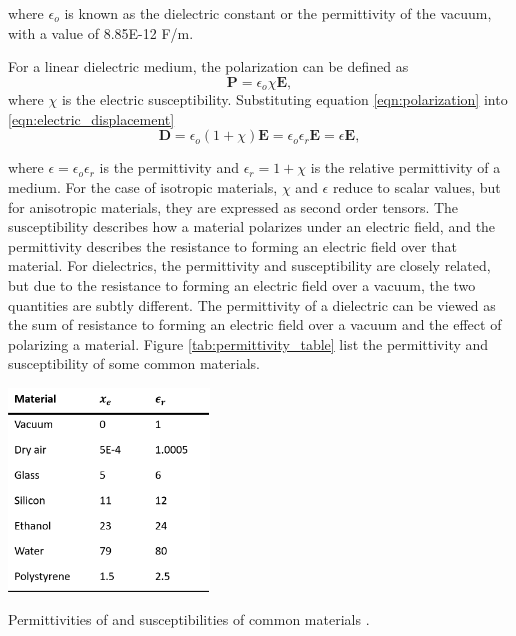  \noindent where $\epsilon_o$ is known as the dielectric constant or the permittivity of the vacuum, with a value of 8.85E-12 F/m.
 
 \par For a linear dielectric medium, the polarization can be defined as 
 \begin{equation}
     \boldsymbol{P} = \epsilon_o\chi\boldsymbol{E},
     \label{eqn:polarization}
 \end{equation}
 \noindent where $\chi$ is the electric susceptibility. Substituting equation \ref{eqn:polarization} into \ref{eqn:electric_displacement}
 \begin{equation}
    \boldsymbol{D} = \epsilon_o(1+\chi)\boldsymbol{E} = \epsilon_o \epsilon_r \boldsymbol{E}=\epsilon\boldsymbol{E},
 \end{equation}
 
 \noindent where $\epsilon = \epsilon_o\epsilon_r$ is the permittivity and $\epsilon_r = 1 + \chi$ is the relative permittivity of a medium. For the case of isotropic materials, $\chi$ and $\epsilon$ reduce to scalar values, but for anisotropic materials, they are expressed as second order tensors. The susceptibility describes how a material polarizes under an electric field, and the permittivity describes the resistance to forming an electric field over that material. For dielectrics, the permittivity and susceptibility are closely related, but due to the resistance to forming an electric field over a vacuum, the two quantities are subtly different. The permittivity of a dielectric can be viewed as the sum of resistance to forming an electric field over a vacuum and the effect of polarizing a material.  Figure \ref{tab:permittivity_table} list the permittivity and susceptibility of some common materials.
 
 \begin{table}[h]
     \centering
     \includegraphics[width=0.4\textwidth]{images/permittivityTable.png}
     \caption[Permittivities of and susceptibilities of common materials]{Permittivities of and susceptibilities of common materials \cite{kirby_micro-and_2010}.}
     \label{tab:permittivity_table}
 \end{table}

